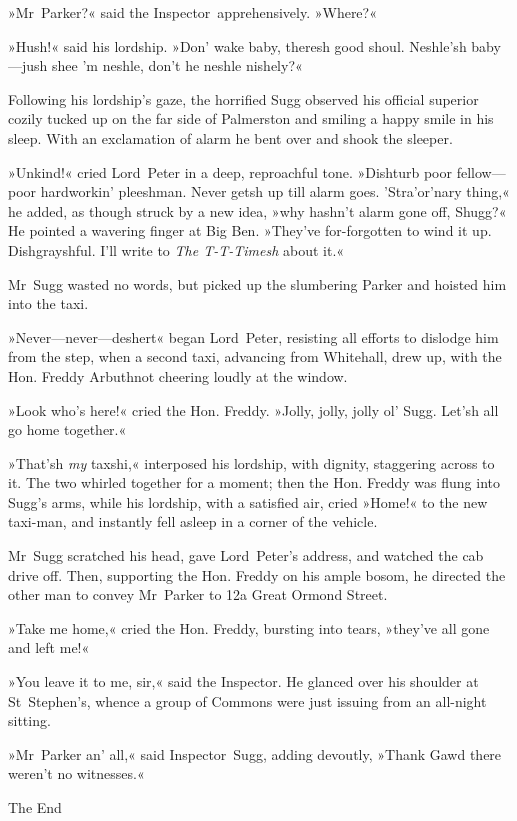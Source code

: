 »Mr~Parker?« said the Inspector~apprehensively. »Where?«

»Hush!« said his lordship. »Don' wake baby, theresh good shoul.  Neshle'sh baby—jush shee 'm neshle, don't he neshle nishely?«

Following his lordship's gaze, the horrified Sugg observed his official superior cozily tucked up on the far side of Palmerston and smiling a happy smile in his sleep. With an exclamation of alarm he bent over and shook the sleeper.

»Unkind!« cried Lord~Peter in a deep, reproachful tone. »Dishturb poor fellow—poor hardworkin' pleeshman. Never getsh up till alarm goes\textellipsis .  'Stra'or'nary thing,« he added, as though struck by a new idea, »why hashn't alarm gone off, Shugg?« He pointed a wavering finger at Big Ben. »They've for-forgotten to wind it up. Dishgrayshful. I'll write to \textit{The T-T-Timesh} about it.«

Mr~Sugg wasted no words, but picked up the slumbering Parker and hoisted him into the taxi.

»Never—never—deshert\longdash« began Lord~Peter, resisting all efforts to dislodge him from the step, when a second taxi, advancing from Whitehall, drew up, with the Hon. Freddy Arbuthnot cheering loudly at the window.

»Look who's here!« cried the Hon. Freddy. »Jolly, jolly, jolly ol' Sugg. Let'sh all go home together.«

»That'sh \textit{my} taxshi,« interposed his lordship, with dignity, staggering across to it. The two whirled together for a moment; then the Hon. Freddy was flung into Sugg's arms, while his lordship, with a satisfied air, cried »Home!« to the new taxi-man, and instantly fell asleep in a corner of the vehicle.

Mr~Sugg scratched his head, gave Lord~Peter's address, and watched the cab drive off. Then, supporting the Hon. Freddy on his ample bosom, he directed the other man to convey Mr~Parker to 12a Great Ormond Street.

»Take me home,« cried the Hon. Freddy, bursting into tears, »they've all gone and left me!«

»You leave it to me, sir,« said the Inspector. He glanced over his shoulder at St~Stephen's, whence a group of Commons were just issuing from an all-night sitting.

»Mr~Parker an' all,« said Inspector~Sugg, adding devoutly, »Thank Gawd there weren't no witnesses.«
\vfill

\begin{center}\mytitlefont\reasonablyhuge
	The End
\end{center}